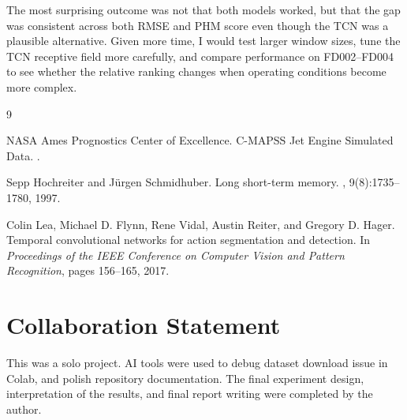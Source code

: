 \documentclass{article}
\begin{document}
The most surprising outcome was not that both models worked, but that the gap was consistent across both RMSE and PHM score even though the TCN was a plausible alternative. Given more time, I would test larger window sizes, tune the TCN receptive field more carefully, and compare performance on FD002--FD004 to see whether the relative ranking changes when operating conditions become more complex.

\begin{thebibliography}{9}

NASA Ames Prognostics Center of Excellence.
\newblock C-MAPSS Jet Engine Simulated Data.
.

Sepp Hochreiter and J{\"u}rgen Schmidhuber.
\newblock Long short-term memory.
, 9(8):1735--1780, 1997.

Colin Lea, Michael D. Flynn, Rene Vidal, Austin Reiter, and Gregory D. Hager.
\newblock Temporal convolutional networks for action segmentation and detection.
\newblock In {\em Proceedings of the IEEE Conference on Computer Vision and Pattern Recognition}, pages 156--165, 2017.

\end{thebibliography}

\clearpage
\section*{Collaboration Statement}

This was a solo project. AI tools were used to debug dataset download issue in Colab, and polish repository documentation. The final experiment design, interpretation of the results, and final report writing were completed by the author.
\end{document}
